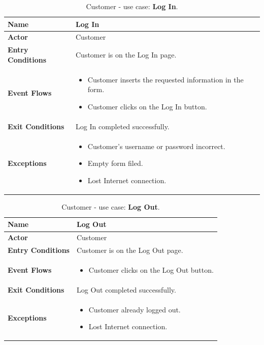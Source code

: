\begin{table}[h!]
\centering
\begin{tabular}{| m{} | m{} |} 
	\hline
	\textbf{Name} & Log In \\ 
	\hline
	\textbf{Actor} & Customer \\ 
	\hline
	\textbf{Entry Conditions} & Customer is on the Log In page. \\ 
	\hline
	\textbf{Event Flows} &
	\begin{itemize}
	\item Customer inserts the requested information in the form.
	\item Customer clicks on the Log In button.
	\end{itemize} \\ 
	\hline
	\textbf{Exit Conditions} & Log In completed successfully. \\ 
	\hline
	\textbf{Exceptions} &
	\begin{itemize}
	\item Customer's username or password incorrect.
	\item Empty form filed.
	\item Lost Internet connection.
	\end{itemize} \\ 
	\hline
\end{tabular}
\caption{Customer - use case: \textbf{Log In}.}
\label{tableLogIn}
\end{table}

\begin{table}[h!]
\centering
\begin{tabular}{| m{} | m{} |} 
	\hline
	\textbf{Name} & Log Out \\ 
	\hline
	\textbf{Actor} & Customer \\ 
	\hline
	\textbf{Entry Conditions} & Customer is on the Log Out page. \\ 
	\hline
	\textbf{Event Flows} &
	\begin{itemize}
	\item Customer clicks on the Log Out button.
	\end{itemize} \\ 
	\hline
	\textbf{Exit Conditions} & Log Out completed successfully. \\ 
	\hline
	\textbf{Exceptions} &
	\begin{itemize}
	\item Customer already logged out.
	\item Lost Internet connection.
	\end{itemize} \\ 
	\hline
\end{tabular}
\caption{Customer - use case: \textbf{Log Out}.}
\label{tableLogIn}
\end{table}


